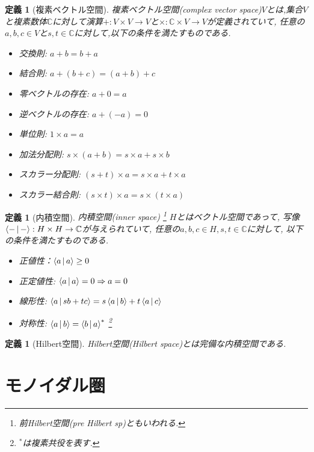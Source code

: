 \documentclass[a4paper,12pt]{ltjsarticle}
\theoremstyle{break}
\newtheorem{defn}[thm]{定義}
\newcommand{\mbc}{\mathbb{C}}
\newcommand{\ra}{\Rightarrow}
\newcommand{\ti}{\times}
\numberwithin{equation}{section}
\begin{document}
\begin{defn}[複素ベクトル空間]
  複素ベクトル空間(complex vector space)$V$とは,集合$V$と複素数体$\mbc$に対して演算$+: V \ti V \to V$と$\ti: \mbc \ti V \to V$が定義されていて, 任意の$a, b, c \in V$と$s,t \in \mbc$に対して,以下の条件を満たすものである. 
  \begin{itemize}
    \item 交換則: $a + b = b + a$
    \item 結合則: $a + (b + c) = (a + b) + c$
    \item 零ベクトルの存在: $a + 0 = a$
    \item 逆ベクトルの存在: $a + (-a) = 0$
    \item 単位則: $1 \ti a = a$
    \item 加法分配則: $s \ti (a + b) = s \ti a + s \ti b$
    \item スカラー分配則: $(s + t) \ti a = s \ti a + t \ti a$
    \item スカラー結合則:  $(s \ti t) \ti a = s \ti (t \ti a)$
  \end{itemize}
\end{defn}

\begin{defn}[内積空間]
  内積空間(inner space)
  \footnote{
    前Hilbert空間(pre Hilbert sp)ともいわれる. 
  }
  $H$とはベクトル空間であって, 写像$\Braket{-|-}: H \ti H \to \mbc$が与えられていて, 任意の$a,b,c \in H, s,t \in \mbc$に対して, 以下の条件を満たすものである. 
  \begin{itemize}
    \item 正値性：$\Braket{a|a} \geq 0$
    \item 正定値性: $\Braket{a|a}=0 \ra a=0$
    \item 線形性: $\Braket{a|sb+tc} = s\Braket{a|b}+t\Braket{a|c}$
    \item 対称性: $\Braket{a|b}=\Braket{b|a}^*$
    \footnote{
      ${}^*$は複素共役を表す. 
    }
  \end{itemize}
\end{defn}

\begin{defn}[Hilbert空間]
  Hilbert空間(Hilbert space)とは完備な内積空間である. 
\end{defn}  

\newpage

\section{モノイダル圏}
\end{document}
